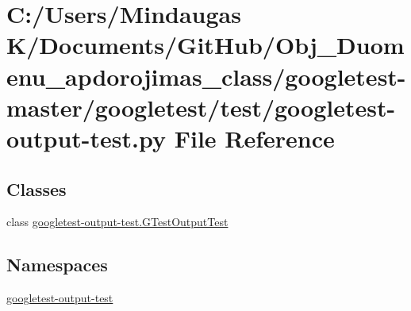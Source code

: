 \hypertarget{googletest-master_2googletest_2test_2googletest-output-test_8py}{}\section{C\+:/\+Users/\+Mindaugas K/\+Documents/\+Git\+Hub/\+Obj\+\_\+\+Duomenu\+\_\+apdorojimas\+\_\+class/googletest-\/master/googletest/test/googletest-\/output-\/test.py File Reference}
\label{googletest-master_2googletest_2test_2googletest-output-test_8py}
\subsection*{Classes}
\begin{DoxyCompactItemize}
\item 
class \mbox{\hyperlink{classgoogletest-output-test_1_1_g_test_output_test}{googletest-\/output-\/test.\+G\+Test\+Output\+Test}}
\end{DoxyCompactItemize}
\subsection*{Namespaces}
\begin{DoxyCompactItemize}
\item 
 \mbox{\hyperlink{namespacegoogletest-output-test}{googletest-\/output-\/test}}
\end{DoxyCompactItemize}
